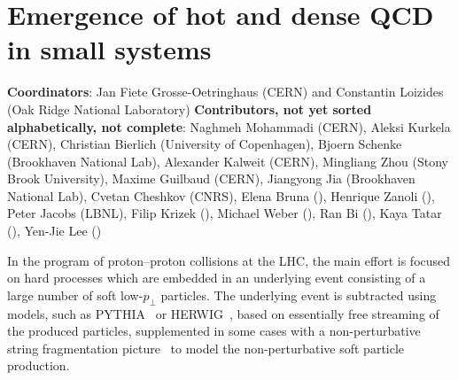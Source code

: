 \documentclass[../report.tex]{subfiles}
\begin{document}
\section{Emergence of hot and dense QCD in small systems}

\textbf{Coordinators}: Jan Fiete Grosse-Oetringhaus (CERN) and Constantin Loizides (Oak Ridge National Laboratory) 
\linebreak
\textbf{Contributors, not yet sorted alphabetically, not complete}:
Naghmeh Mohammadi (CERN), 
Aleksi Kurkela (CERN), 
Christian Bierlich (University of Copenhagen), 
Bjoern Schenke (Brookhaven National Lab), 
Alexander Kalweit (CERN),
Mingliang Zhou (Stony Brook University),
Maxime Guilbaud (CERN),
Jiangyong Jia (Brookhaven National Lab), 
Cvetan Cheshkov (CNRS),
Elena Bruna (),
Henrique Zanoli (),
Peter Jacobs (LBNL),
Filip Krizek (),
Michael Weber (),
Ran Bi (),
Kaya Tatar (),
Yen-Jie Lee ()

\label{sec:smallsyst}

In the program of proton--proton collisions at the LHC, the main effort is focused on hard processes which are embedded in an underlying event consisting of a large number of soft low-$p_\perp$ particles. The underlying event is subtracted using models, such as PYTHIA~\cite{Sjostrand:2014zea} or HERWIG~\cite{Bellm:2015jjp}, based on essentially free streaming of the produced particles, supplemented in some cases with a non-perturbative string fragmentation picture~\cite{Andersson:1983ia} to model the non-perturbative soft particle production.  
\end{document}
